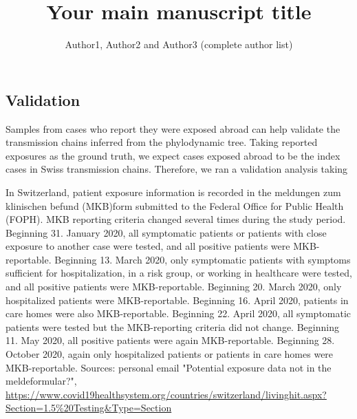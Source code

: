 \documentclass[9pt,twoside,lineno]{pnas-new}
\title{Your main manuscript title}
\author{Author1, Author2 and Author3 (complete author list)}
\begin{document}
\instructionspage  

\maketitle

\SItext


\subsection{Validation}
Samples from cases who report they were exposed abroad can help validate the transmission chains inferred from the phylodynamic tree. Taking reported exposures as the ground truth, we expect cases exposed abroad to be the index cases in Swiss transmission chains. Therefore, we ran a validation analysis taking 

In Switzerland, patient exposure information is recorded in the meldungen zum klinischen befund (MKB)form submitted to the Federal Office for Public Health (FOPH). MKB reporting criteria changed several times during the study period. Beginning 31. January 2020, all symptomatic patients or patients with close exposure to another case were tested, and all positive patients were MKB-reportable. Beginning 13. March 2020, only symptomatic patients with symptoms sufficient for hospitalization, in a risk group, or working in healthcare were tested, and all positive patients were MKB-reportable. Beginning 20. March 2020, only hospitalized patients were MKB-reportable. Beginning 16. April 2020, patients in care homes were also MKB-reportable. Beginning 22. April 2020, all symptomatic patients were tested but the MKB-reporting criteria did not change. Beginning 11. May 2020, all positive patients were again MKB-reportable. Beginning 28. October 2020, again only hospitalized patients or patients in care homes were MKB-reportable. Sources: personal email "Potential exposure data not in the meldeformular?", \url{https://www.covid19healthsystem.org/countries/switzerland/livinghit.aspx?Section=1.5%20Testing&Type=Section}
\end{document}
